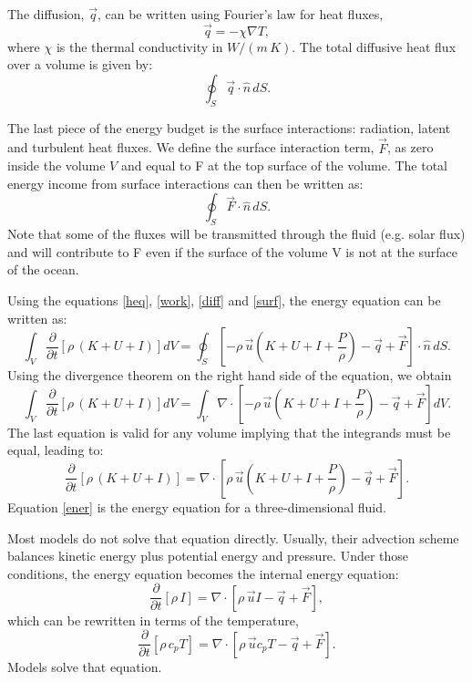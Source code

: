 The diffusion, $\vec{q}$, can be written using Fourier's law for heat fluxes,
\begin{equation}
\vec{q} = - \chi \nabla T,
\end{equation}
where $\chi$ is the thermal conductivity in $W/(m \, K)$. The total diffusive heat flux over a volume is given by:
\begin{equation}\label{diff}
\oint_S \vec{q}\cdot \hat{n}\, dS.
\end{equation}

The last piece of the energy budget is the surface interactions: radiation, latent and turbulent heat fluxes. We define the surface interaction term, $\vec{F}$, as zero inside the volume $V$ and equal to F at the top surface of the volume. The total energy income from surface interactions can then be written as:
\begin{equation}\label{surf}
\oint_S \vec{F} \cdot \hat{n} \,dS.
\end{equation}
Note that some of the fluxes will be transmitted through the fluid (e.g. solar flux) and will contribute to F even if the surface of the volume V is not at the surface of the ocean.

Using the equations \ref{heq}, \ref{work}, \ref{diff} and \ref{surf}, the energy equation can be written as:
\begin{equation}
\int_V \frac{\partial}{\partial t} \left[ \rho \, (K+U+I) \right]  dV = \oint_S \left[{-\rho \, \vec{u} (K+U+I+\frac{P}{\rho}) - \vec{q} + \vec{F} } \right] \cdot \hat{n}\, dS.
\end{equation}
Using the divergence theorem on the right hand side of the equation, we obtain
\begin{equation}
\int_V \frac{\partial}{\partial t} \left[ \rho \, (K+U+I) \right]  dV = \int_V \nabla \cdot \left[{-\rho \, \vec{u} (K+U+I+\frac{P}{\rho}) - \vec{q} + \vec{F}  } \right] dV.
\end{equation}
The last equation is valid for any volume implying that the integrands must be equal, leading to:
\begin{equation}\label{ener}
\frac{\partial}{\partial t} \left[ \rho \, (K+U+I) \right] = \nabla \cdot \left[{\rho \, \vec{u} (K+U+I+\frac{P}{\rho}) - \vec{q} + \vec{F}  } \right].
\end{equation}
Equation \ref{ener} is the energy equation for a three-dimensional fluid.

Most models do not solve that equation directly. Usually, their advection scheme balances kinetic energy plus potential energy and pressure. Under those conditions, the energy equation becomes the internal energy equation:
\begin{equation}\label{internal}
\frac{\partial}{\partial t} \left[ \rho \, I \right] = \nabla \cdot \left[{\rho \, \vec{u} I - \vec{q} + \vec{F}} \right],
\end{equation}
which can be rewritten in terms of the temperature,
\begin{equation}\label{Tequ}
\frac{\partial}{\partial t} \left[ \rho \, c_{p} T \right] = \nabla \cdot \left[{\rho \, \vec{u} c_{p} T - \vec{q} + \vec{F}} \right].
\end{equation}
Models solve that equation.

